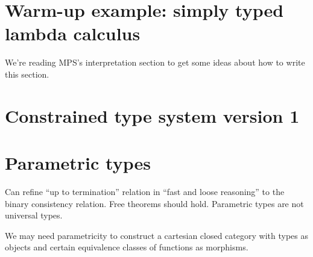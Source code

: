 \documentclass{amsart}
\begin{document}
\section{Warm-up example: simply typed lambda calculus}

We're reading MPS's interpretation section to get some ideas
about how to write this section.



\section{Constrained type system version 1}



\section{Parametric types}

Can refine ``up to termination'' relation in ``fast and loose
reasoning'' to the binary consistency relation. Free theorems
should hold. Parametric types are not universal types.

We may need parametricity to construct a cartesian closed
category with types as objects and certain equivalence classes of
functions as morphisms.



\end{document}
